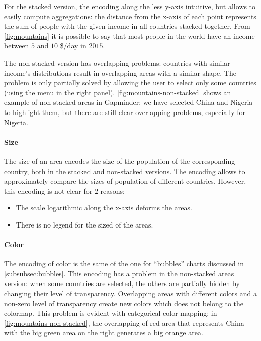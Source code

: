 For the stacked version, the encoding along the less y-axis intuitive, but allows to easily compute aggregations:
the distance from the x-axis of each point represents the sum of people with the given income in all countries stacked together.
From \cref{fig:mountains} it is possible to say that most people in the world have an income between $5$ and $10$ \$/day in $2015$.

The non-stacked version has overlapping problems:
countries with similar income's distributions result in overlapping areas with a similar shape.
The problem is only partially solved by allowing the user to select only some countries (using the menu in the right panel).
\cref{fig:mountains-non-stacked} shows an example of non-stacked areas in Gapminder:
we have selected China and Nigeria to highlight them, but there are still clear overlapping problems, especially for Nigeria.

\paragraph{Size}
The size of an area encodes the size of the population of the corresponding country, both in the stacked and non-stacked versions.
The encoding allows to approximately compare the sizes of population of different countries.
However, this encoding is not clear for $2$ reasons:
\begin{itemize}
	\item The scale logarithmic along the x-axis deforms the areas.
	\item There is no legend for the sized of the areas.
\end{itemize}

\paragraph{Color}
The encoding of color is the same of the one for ``bubbles'' charts discussed in \cref{subsubsec:bubbles}.
This encoding has a problem in the non-stacked areas version:
when some countries are selected, the others are partially hidden by changing their level of transparency.
Overlapping areas with different colors and a non-zero level of transparency create new colors which does not belong to the colormap.
This problem is evident with categorical color mapping:
in \cref{fig:mountains-non-stacked}, the overlapping of red area that represents China with the big green area on the right generates a big orange area.

